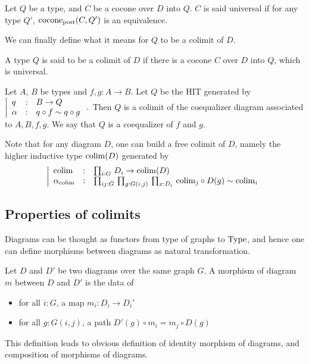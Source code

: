 \begin{defi}
  Let $Q$ be a type, and $C$ be a cocone over $D$ into $Q$. $C$ is
  said universal if for any type $Q'$, $\mathrm{cocone}_{\mathrm{post}}(C,Q')$ is
  an equivalence.
\end{defi}

We can finally define what it means for $Q$ to be a colimit of $D$.

\begin{defi}[Colimit]\label{defi:colimit}
  A type $Q$ is said to be a colimit of $D$ if there is a cocone $C$
  over $D$ into $Q$, which is universal.
\end{defi}

\begin{exm}
  Let $A$, $B$ be types and $f,g:A\to B$.
  Let $Q$ be the HIT generated by
  $\left|
  \begin{array}{lll}
    q & : & B \to Q \\
    \alpha & : & q \circ f \sim q \circ g
  \end{array} \right. .$
Then $Q$ is a colimit of the coequalizer diagram associated to
$A,B,f,g$. We say that $Q$ is a coequalizer of $f$ and $g$.
\end{exm}

Note that for any diagram $D$, one can build a free colimit of $D$,
namely the higher inductive type $\mathrm{colim}(D)$ generated by
\[ 
  \left|
    \begin{array}{lll}
      \mathrm{colim} & : & \prod_{i:G}\, D_i \to \mathrm{colim}(D) \\
      \alpha_{\mathrm{colim}} & : & \prod_{i j:G}\, \prod_{g:G(i,j)}\, \prod_{x:D_i}\, \mathrm{colim}_j \circ D(g) \sim \mathrm{colim}_i
    \end{array} \right.
\]

\subsection{Properties of colimits}
\label{ssec:prop_colim}

Diagrams can be thought as functors from type of graphs to $\operatorname{Type}$,
and hence one can define morphisms between diagrams as natural
transformation.

\begin{defi}
  Let $D$ and $D'$ be two diagrams over the same graph $G$. A morphism
  of diagram $m$ between $D$ and $D'$ is the data of
  \begin{itemize}
  \item for all $i:G$, a map $m_i : D_i \to D_i'$
  \item for all $g:G(i,j)$, a path $D'(g) \circ m_i = m_j \circ D(g)$
  \end{itemize}
  This definition leads to obvious definition of identity morphism of
  diagrams, and composition of morphisms of diagrams.
\end{defi}

